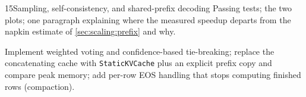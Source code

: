 \begin{labbox}{15}{Sampling, self-consistency, and shared-prefix decoding}
Passing tests; the two plots; one paragraph explaining where the measured speedup departs from the
napkin estimate of \cref{sec:scaling:prefix} and why.

Implement weighted voting and confidence-based tie-breaking; replace the concatenating cache with
\texttt{StaticKVCache} plus an explicit prefix copy and compare peak memory; add per-row EOS handling
that stops computing finished rows (compaction).
\end{labbox}

